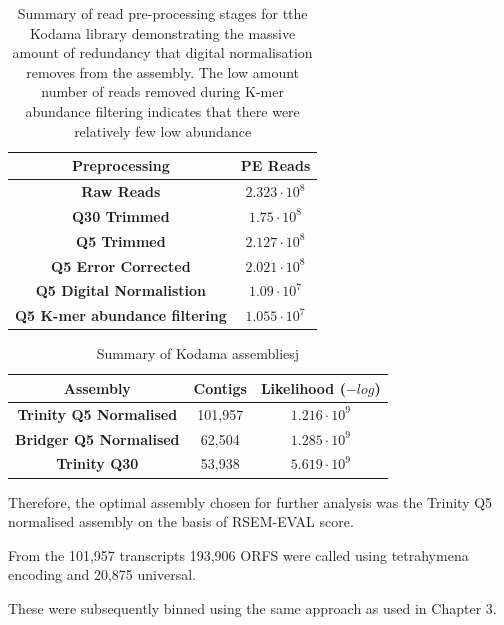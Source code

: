 \begin{table}
    \begin{tabular}{|c|c|}
        \hline
        \textbf{Preprocessing} & \textbf{PE Reads} \\
        \hline
        \textbf{Raw Reads}  & \(2.323\cdot10^{8}\)\\
        \textbf{Q30 Trimmed} & \(1.75\cdot10^{8}\)\\
        \textbf{Q5 Trimmed}  & \(2.127\cdot10^{8} \) \\
        \textbf{Q5 Error Corrected}  & \(2.021\cdot10^{8}\)\\
        \textbf{Q5 Digital Normalistion} & \(1.09 \cdot10^{7}\)\\ 
        \textbf{Q5 K-mer abundance filtering} & \(1.055\cdot10^{7}\)\\
        \hline
    \end{tabular}
    \caption{Summary of read pre-processing stages for tthe Kodama library demonstrating
    the massive amount of redundancy that digital normalisation removes from the assembly.
The low amount number of reads removed during K-mer abundance filtering indicates
that there were relatively few low abundance 
}
    \label{tab:kodama_preproc}
\end{table}

\begin{table}
    \begin{tabular}{|c|c|c|}
        \hline
        \textbf{Assembly} & \textbf{Contigs} & \textbf{Likelihood (\(-log\))}\\
        \hline
        \textbf{Trinity Q5 Normalised}  & 101,957 & \(1.216\cdot10^9\)\\
        \textbf{Bridger Q5 Normalised} & 62,504 & \(1.285\cdot10^9\)\\
        \textbf{Trinity Q30} & 53,938  & \(5.619\cdot10^{9} \) \\
        \hline
    \end{tabular}
    \caption{Summary of Kodama assembliesj}
    \label{tab:kodama_assembly}
\end{table}

Therefore, the optimal assembly chosen for further analysis was the Trinity
Q5 normalised assembly on the basis of RSEM-EVAL score. 

From the 101,957 transcripts 193,906 ORFS were called using tetrahymena 
encoding and 20,875 universal.

These were subsequently binned using the same approach as used in 
Chapter 3. 

